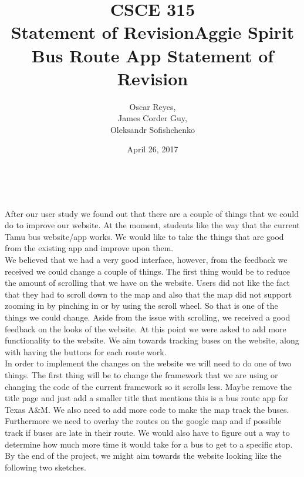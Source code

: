 \documentclass[12pt]{report}
\title{CSCE 315 \\ Statement of Revision}
\author{Oscar Reyes,\\
	James Corder Guy,\\
	Oleksandr Sofishchenko}
\date{April 26, 2017}
\begin{document}
	
	\maketitle
	
	\newpage
	
	\begin{center}
		\title{\textbf{Aggie Spirit Bus Route App Statement of Revision}} \\
		
	\end{center}

	After our user study we found out that there are a couple of things that we could do to improve our website. At the moment, students like the way that the current Tamu bus website/app works. We would like to take the things that are good from the existing app and improve upon them.\\
	
	We believed that we had a very good interface, however, from the feedback we received we could change a couple of things. The first thing would be to reduce the amount of scrolling that we have on the website. Users did not like the fact that they had to scroll down to the map and also that the map did not support zooming in by pinching in or by using the scroll wheel. So that is one of the things we could change. Aside from the issue with scrolling, we received a good feedback on the looks of the website. At this point we were asked to add more functionality to the website. We aim towards tracking buses on the website, along with having the buttons for each route work.\\
	
	In order to implement the changes on the website we will need to do one of two things. The first thing will be to change the framework that we are using or changing the code of the current framework so it scrolls less. Maybe remove the title page and just add a smaller title that mentions this is a bus route app for Texas A\&M. We also need to add more code to make the map track the buses. Furthermore we need to overlay the routes on the google map and if possible track if buses are late in their route. We would also have to figure out a way to determine how much more time it would take for a bus to get to a specific stop.\\
	
	By the end of the project, we might aim towards the website looking like the following two sketches. \\
	
\end{document}
